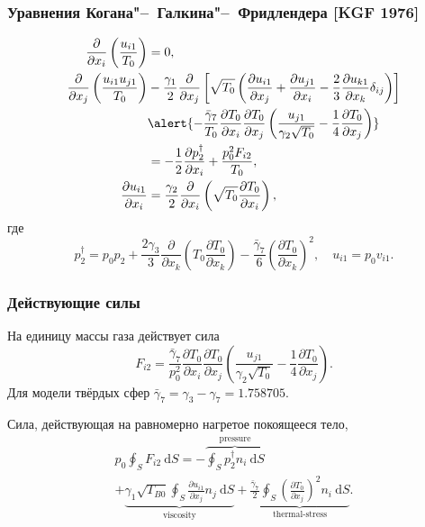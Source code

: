 \documentclass[mathserif]{beamer} %
\newcommand{\dd}{\:\mathrm{d}}
\newcommand{\pder}[2][]{\frac{\partial#1}{\partial#2}}
\begin{document}
\begin{frame}
    \frametitle{Уравнения Когана"--~Галкина"--~Фридлендера [KGF 1976]}
    \begin{align}
        \pder{x_i}\left(\frac{u_{i1}}{T_0}\right) &= 0, \label{eq:asymptotic1} \\
        \pder{x_j}\left(\frac{u_{i1}u_{j1}}{T_0}\right)
            &-\frac{\gamma_1}2\pder{x_j}\left[\sqrt{T_0}\left(
                \pder[u_{i1}]{x_j} + \pder[u_{j1}]{x_i} - \frac23\pder[u_{k1}]{x_k}\delta_{ij}
            \right)\right] \notag\\
            &\alert{- \frac{\bar{\gamma}_7}{T_0}\pder[T_0]{x_i}\pder[T_0]{x_j}
                \left(\frac{u_{j1}}{\gamma_2\sqrt{T_0}} - \frac{1}4\pder[T_0]{x_j}\right)} \notag\\
            &= -\frac12\pder[p_2^\dag]{x_i} + \frac{p_0^2 F_{i2}}{T_0}, \label{eq:asymptotic2} \\
        \pder[u_{i1}]{x_i} &= \frac{\gamma_2}2\pder{x_i}\left(\sqrt{T_0}\pder[T_0]{x_i}\right), \label{eq:asymptotic3}
    \end{align}
    где
    \begin{equation}\label{eq:dag_pressure}
        p_2^\dag = p_0 p_2
            + \frac{2\gamma_3}{3}\pder{x_k}\left(T_0\pder[T_0]{x_k}\right)
            - \frac{\bar{\gamma}_7}{6}\left(\pder[T_0]{x_k}\right)^2, \quad u_{i1} = p_0v_{i1}.
    \end{equation}
\end{frame}

\begin{frame}
    \frametitle{Действующие силы}
    На единицу массы газа действует сила
    \begin{equation}\label{eq:gamma7_force}
        F_{i2} = \frac{\bar{\gamma}_7}{p_0^2}\pder[T_0]{x_i}\pder[T_0]{x_j}\left(\frac{u_{j1}}{\gamma_2\sqrt{T_0}}
            - \frac{1}4\pder[T_0]{x_j}\right).
    \end{equation}
    Для модели твёрдых сфер \(\bar{\gamma}_7 = \gamma_3 - \gamma_7 = 1.758705\).
    \vspace{20pt}\pause

    Сила, действующая на равномерно нагретое покоящееся тело,
    \begin{multline}\label{eq:force:terms}
        p_0 \oint_S F_{i2} \dd{S} =
            - \overbrace{ \oint_S p_2^\dag n_i \dd{S} }^\text{pressure} \\
            + \underbrace{ \gamma_1 \sqrt{T_{B0}} \oint_S \pder[u_{i1}]{x_j} n_j \dd{S} }_\text{viscosity}
            + \underbrace{ \frac{\bar{\gamma}_7}{2} \oint_S \left(\pder[T_0]{x_j}\right)^2 n_i \dd{S} }_\text{thermal-stress}.
    \end{multline}
\end{frame}
\end{document}
